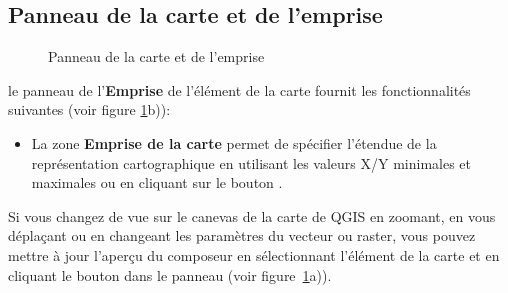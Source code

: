 \subsection{Panneau de la carte et de l'emprise}

\begin{figure}[ht]
  \centering
    \hspace{1cm}
  \caption{Panneau de la carte et de l'emprise \nixcaption}\label{fig:mapdialog} 
\end{figure}


le panneau de l'\textbf{Emprise} de l'élément de la carte fournit les fonctionnalités suivantes (voir figure \ref{fig:mapdialog}b)):

\begin{itemize}[label=--]
\item La zone \textbf{Emprise de la carte} permet de spécifier l'étendue de la représentation cartographique en utilisant les valeurs X/Y minimales et maximales ou en cliquant sur le bouton  .
\end{itemize}

Si vous changez de vue sur le canevas de la carte de QGIS en zoomant, en vous déplaçant ou en changeant les paramètres du vecteur ou raster, vous pouvez mettre à jour l'aperçu du composeur en sélectionnant l'élément de la carte et en cliquant le bouton  dans le panneau   (voir figure~\ref{fig:mapdialog}a)).

